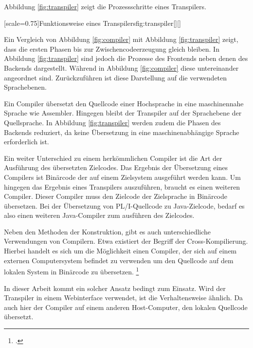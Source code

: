 Abbildung \ref{fig:transpiler} zeigt die Prozessschritte eines Transpilers.

\pagebreak
{}[scale=0.75]{Funktionsweise eines Transpilers}{fig:transpiler}[][]
\pagebreak

Ein Vergleich von Abbildung \ref{fig:compiler} mit Abbildung \ref{fig:transpiler} zeigt, dass die ersten Phasen bis zur Zwischencodeerzeugung gleich bleiben. In Abbildung \ref{fig:transpiler} sind jedoch die Prozesse des Frontends neben denen des Backends dargestellt. Während in Abbildung \ref{fig:compiler} diese untereinander angeordnet sind. Zurückzuführen ist diese Darstellung auf die verwendeten Sprachebenen.

Ein Compiler übersetzt den Quellcode einer Hochsprache in eine maschinennahe Sprache wie Assembler. Hingegen bleibt der Transpiler auf der Sprachebene der Quellsprache. In Abbildung \ref{fig:transpiler} werden zudem die Phasen des Backends reduziert, da keine Übersetzung in eine maschinenabhängige Sprache erforderlich ist.

Ein weiter Unterschied zu einem herkömmlichen Compiler ist die Art der Ausführung des übersetzten Zielcodes.
Das Ergebnis der Übersetzung eines Compilers ist Binärcode der auf einem Zielsystem ausgeführt werden kann. Um hingegen das Ergebnis eines Transpilers auszuführen,
braucht es einen weiteren Compiler. Dieser Compiler muss den Zielcode der Zielsprache in Binärcode übersetzen.
Bei der Übersetzung von PL/I-Quellcode zu Java-Zielcode, bedarf es also einen weiteren Java-Compiler zum ausführen des Zielcodes.

Neben den Methoden der Konstruktion, gibt es auch unterschiedliche Verwendungen von Compilern. 
Etwa existiert der Begriff der Cross-Kompilierung. Hierbei handelt es sich um die Möglichkeit einen Compiler, der sich auf einem externen Computersystem befindet zu verwenden um den Quellcode auf dem lokalen System in Binärcode zu übersetzen. \footcite[Vgl. ][]{guncross}

In dieser Arbeit kommt ein solcher Ansatz bedingt zum Einsatz. Wird der Transpiler in einem Webinterface verwendet, ist die Verhaltensweise ähnlich.
Da auch hier der Compiler auf einem anderen Host-Computer, den lokalen Quellcode übersetzt.

